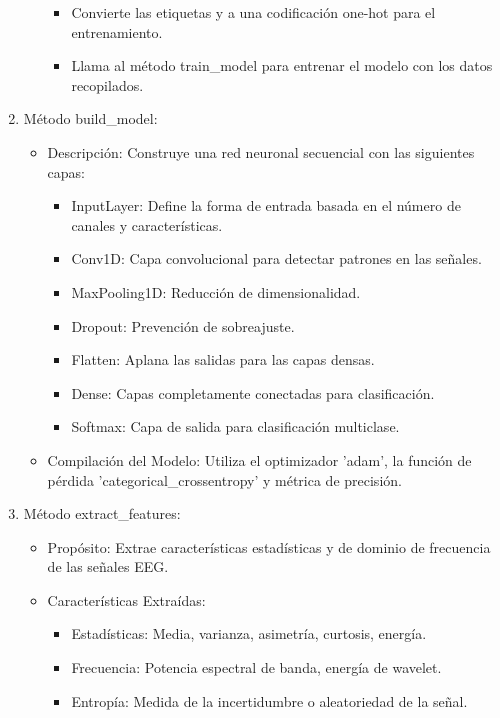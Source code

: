 \documentclass{article}
\begin{document}
\begin{enumerate}
\begin{itemize}
\begin{itemize}
            \item Convierte las etiquetas y a una codificación one-hot para el entrenamiento.
           \item Llama al método train\_model para entrenar el modelo con los datos recopilados.
        \end{itemize}
    \end{itemize}
    \item Método build\_model:
    \begin{itemize}
        \item Descripción: Construye una red neuronal secuencial con las siguientes capas:
        \begin{itemize}
            \item InputLayer: Define la forma de entrada basada en el número de canales y características.
            \item Conv1D: Capa convolucional para detectar patrones en las señales.
            \item MaxPooling1D: Reducción de dimensionalidad.
            \item Dropout: Prevención de sobreajuste.
            \item Flatten: Aplana las salidas para las capas densas.
            \item Dense: Capas completamente conectadas para clasificación.
            \item Softmax: Capa de salida para clasificación multiclase.
        \end{itemize}
        \item Compilación del Modelo: Utiliza el optimizador 'adam', la función de pérdida 'categorical\_crossentropy' y métrica de precisión.
    \end{itemize}
    \item Método extract\_features:
    \begin{itemize}
        \item Propósito: Extrae características estadísticas y de dominio de frecuencia de las señales EEG.
        \item Características Extraídas:
        \begin{itemize}
            \item Estadísticas: Media, varianza, asimetría, curtosis, energía.
            \item Frecuencia: Potencia espectral de banda, energía de wavelet.
            \item Entropía: Medida de la incertidumbre o aleatoriedad de la señal.

\end{itemize}
\end{itemize}
\end{enumerate}
\end{document}
